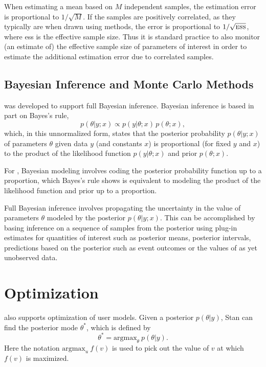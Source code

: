 When estimating a mean based on $M$ independent samples, the
estimation error is proportional to $1/\sqrt{M}$.  If the samples are
positively correlated, as they typically are when drawn using \MCMC
methods, the error is proportional to $1/\sqrt{\mbox{\sc ess}}$, where
{\sc ess} is the effective sample size.  Thus it is standard practice
to also monitor (an estimate of) the effective sample size of
parameters of interest in order to estimate the additional estimation
error due to correlated samples.



\subsection{Bayesian Inference and Monte Carlo Methods}

\Stan was developed to support full Bayesian inference.  Bayesian
inference is based in part on Bayes's rule,
\[
p(\theta|y;x) \propto p(y|\theta;x) \, p(\theta;x),
\]
which, in this unnormalized form, states that the posterior
probability $p(\theta|y;x)$ of parameters $\theta$ given data $y$ (and
constants $x$) is proportional (for fixed $y$ and $x$) to the
product of the likelihood function $p(y|\theta;x)$ and prior
$p(\theta;x)$.

For \Stan, Bayesian modeling involves coding the posterior probability
function up to a proportion, which Bayes's rule shows is equivalent to
modeling the product of the likelihood function and prior up to a
proportion.

Full Bayesian inference involves propagating the uncertainty in the
value of parameters $\theta$ modeled by the posterior $p(\theta|y;x)$.
This can be accomplished by basing inference on a sequence of samples
from the posterior using plug-in estimates for quantities of interest
such as posterior means, posterior intervals, predictions based on the
posterior such as event outcomes or the values of as yet unobserved
data.


\section{Optimization}

\Stan also supports optimization of user models.  Given a posterior
$p(\theta|y)$, Stan can find the posterior mode $\theta^*$, which is
defined by
%
\[
\theta^{*} = \mbox{argmax}_{\theta} \ p(\theta|y).
\]
%
Here the notation $\mbox{argmax}_u \ f(v)$ is used to pick out the value
of $v$ at which $f(v)$ is maximized.  


